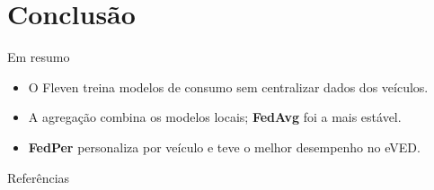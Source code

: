 \documentclass[aspectratio=169,11pt]{beamer}
\begin{document}
\section{Conclusão}

\begin{frame}{Em resumo}
  \begin{itemize}
    \item O Fleven treina modelos de consumo sem centralizar dados dos veículos.
    \item A agregação combina os modelos locais; \textbf{FedAvg} foi a mais estável.
    \item \textbf{FedPer} personaliza por veículo e teve o melhor desempenho no eVED.
  \end{itemize}
\end{frame}

\begin{frame}[allowframebreaks]{Referências}
  \footnotesize
  
  
\end{frame}
\end{document}
